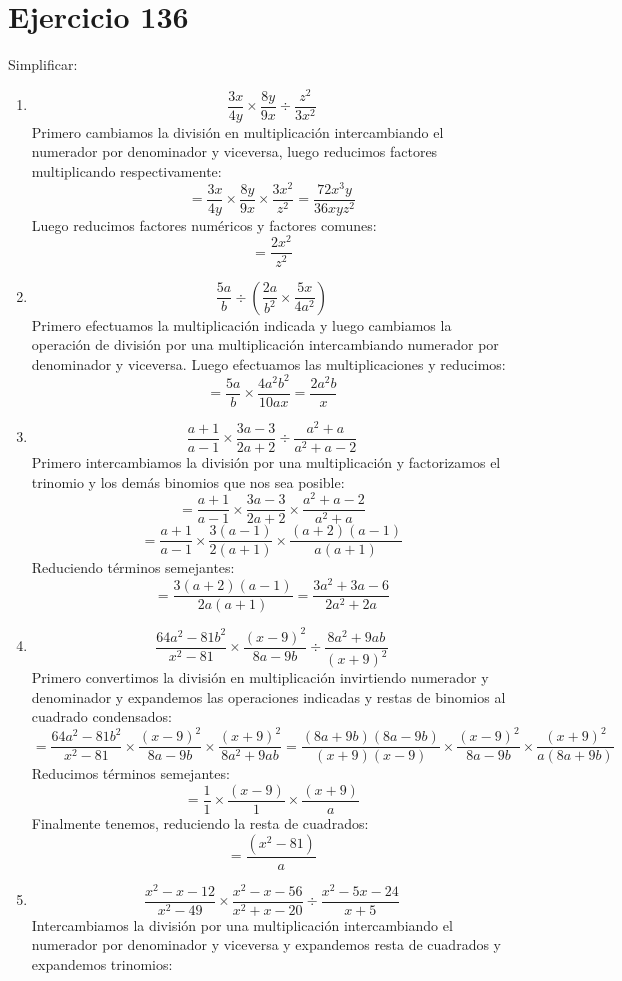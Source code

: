 \documentclass[12pt]{article}
\begin{document}
\section*{Ejercicio 136}
Simplificar:
\begin{enumerate}[label=\bfseries Ejercicio \arabic*:]
  \item $$\frac{3x}{4y} \times \frac{8y}{9x} \div \frac{z^2}{3x^2}$$
Primero cambiamos la división en multiplicación intercambiando el numerador por denominador y viceversa, luego reducimos factores multiplicando respectivamente:
$$= \frac{3x}{4y} \times \frac{8y}{9x} \times \frac{3x^2}{z^2} = \frac{72 x^3y}{36xyz^2}$$
Luego reducimos factores numéricos y factores comunes:
$$= \frac{2x^2}{z^2}$$
  \item $$\frac{5a}{b} \div \left( \frac{2a}{b^2} \times \frac{5x}{4a^2} \right)$$
Primero efectuamos la multiplicación indicada y luego cambiamos la operación de división por una multiplicación intercambiando numerador por denominador y viceversa. Luego efectuamos las multiplicaciones y reducimos:
$$= \frac{5a}{b} \times \frac{4a^2b^2}{10ax} = \frac{2a^2b}{x}$$
  \item $$\frac{a+1}{a-1} \times \frac{3a - 3}{2a + 2} \div \frac{a^2 + a}{a^2 + a - 2}$$
Primero intercambiamos la división por una multiplicación y factorizamos el trinomio y los demás binomios que nos sea posible:
$$= \frac{a+1}{a-1} \times \frac{3a - 3}{2a + 2} \times \frac{a^2 + a - 2}{a^2 + a}$$
$$= \frac{a+1}{a-1} \times \frac{3(a - 1)}{2(a + 1)} \times \frac{(a + 2)(a - 1)}{a (a + 1)}$$
Reduciendo términos semejantes:
$$= \frac{3(a + 2)(a - 1)}{2a(a + 1)} = \frac{3a^2 + 3a - 6}{2a^2 + 2a}$$
  \item $$\frac{64a^2 - 81b^2}{x^2 - 81} \times \frac{(x - 9)^2}{8a - 9b} \div \frac{8a^2 + 9ab}{(x + 9)^2}$$
Primero convertimos la división en multiplicación invirtiendo numerador y denominador y expandemos las operaciones indicadas y restas de binomios al cuadrado condensados:
$$= \frac{64a^2 - 81b^2}{x^2 - 81} \times \frac{(x - 9)^2}{8a - 9b} \times \frac{(x + 9)^2}{8a^2 + 9ab} = \frac{(8a + 9b)(8a - 9b)}{(x + 9)(x - 9)} \times \frac{(x-9)^2}{8a - 9b} \times \frac{(x + 9)^2}{a(8a + 9b)}$$
Reducimos términos semejantes:
$$= \frac{1}{1} \times \frac{(x - 9)}{1} \times \frac{(x + 9)}{a}$$
Finalmente tenemos, reduciendo la resta de cuadrados:
$$= \frac{(x^2 - 81)}{a}$$
  \item $$\frac{x^2 - x - 12}{x^2 - 49} \times \frac{x^2 - x - 56}{x^2 + x - 20} \div \frac{x^2 - 5x - 24}{x + 5}$$
Intercambiamos la división por una multiplicación intercambiando el numerador por denominador y viceversa y expandemos resta de cuadrados y expandemos trinomios:

\end{enumerate}
\end{document}

